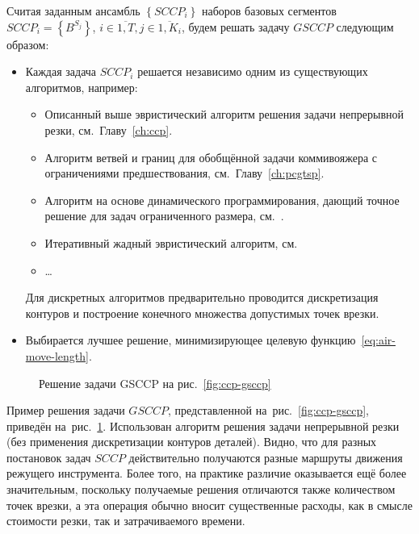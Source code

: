 Считая заданным ансамбль
$\left\{ SCCP_i \right\}$
наборов базовых сегментов
$SCCP_i = \left\{B^{S_j}\right\}$,
$
i \in \overline{1, T},
j \in \overline{1, K_i}
$,
будем решать задачу $GSCCP$
следующим образом:

\begin{itemize}
  \item
  Каждая задача
  $SCCP_i$
  решается независимо одним из существующих алгоритмов, например:
  \begin{itemize}
    \item
    Описанный выше эвристический алгоритм решения задачи непрерывной резки,
    см.~Главу~\ref{ch:ccp}.
    \item
    Алгоритм ветвей и границ для обобщённой задачи коммивояжера
    с ограничениями предшествования,
    см.~Главу~\ref{ch:pcgtsp}.
    \item
    Алгоритм на основе динамического программирования,
    дающий точное решение для задач ограниченного размера,
    см.~\cite{bi:RoMa}.
    \item
    Итеративный жадный эвристический алгоритм,
    см.~\cite{bi:greedy}
    \item \dots
  \end{itemize}
  Для дискретных алгоритмов предварительно проводится
  дискретизация контуров и построение конечного
  множества допустимых точек врезки.
  \item
  Выбирается лучшее решение,
  минимизирующее целевую функцию~\eqref{eq:air-move-length}.
\end{itemize}

\begin{figure}
  \centering
  \caption{Решение задачи GSCCP на рис.~\ref{fig:ccp-gsccp}}
  \label{fig:ccp-gsccp-solution}
\end{figure}

Пример решения задачи $GSCCP$,
представленной на~рис.~\ref{fig:ccp-gsccp},
приведён на~рис.~\ref{fig:ccp-gsccp-solution}.
Использован алгоритм решения задачи непрерывной резки
(без применения дискретизации контуров деталей).
Видно, что для разных постановок задач $SCCP$
действительно получаются разные маршруты
движения режущего инструмента.
Более того,
на практике различие
оказывается ещё более значительным,
поскольку получаемые решения отличаются
также количеством точек врезки,
а эта операция обычно вносит существенные расходы,
как в смысле стоимости резки,
так и затрачиваемого времени.

